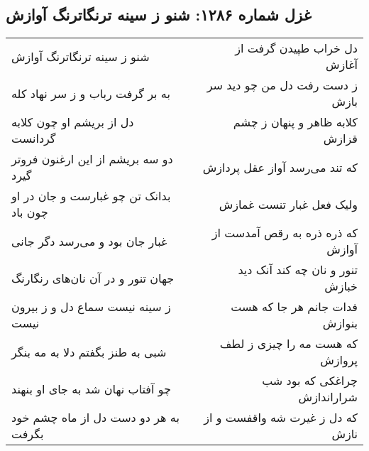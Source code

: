 \begin{center}
\section*{غزل شماره ۱۲۸۶: شنو ز سینه ترنگاترنگ آوازش}
\label{sec:1286}
\begin{longtable}{l p{0.5cm} r}
شنو ز سینه ترنگاترنگ آوازش
&&
دل خراب طپیدن گرفت از آغازش
\\
به بر گرفت رباب و ز سر نهاد کله
&&
ز دست رفت دل من چو دید سر بازش
\\
دل از بریشم او چون کلابه گردانست
&&
کلابه ظاهر و پنهان ز چشم قزازش
\\
دو سه بریشم از این ارغنون فروتر گیرد
&&
که تند می‌رسد آواز عقل پردازش
\\
بدانک تن چو غبارست و جان در او چون باد
&&
ولیک فعل غبار تنست غمازش
\\
غبار جان بود و می‌رسد دگر جانی
&&
که ذره ذره به رقص آمدست از آوازش
\\
جهان تنور و در آن نان‌های رنگارنگ
&&
تنور و نان چه کند آنک دید خبازش
\\
ز سینه نیست سماع دل و ز بیرون نیست
&&
فدات جانم هر جا که هست بنوازش
\\
شبی به طنز بگفتم دلا به مه بنگر
&&
که هست مه را چیزی ز لطف پروازش
\\
چو آفتاب نهان شد به جای او بنهند
&&
چراغکی که بود شب شراراندازش
\\
به هر دو دست دل از ماه چشم خود بگرفت
&&
که دل ز غیرت شه واقفست و از نازش
\\
\end{longtable}
\end{center}
